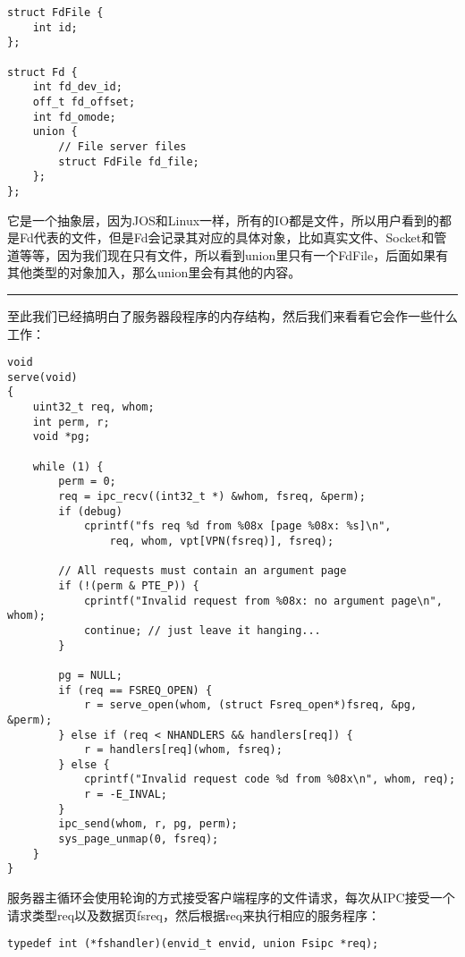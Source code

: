 \documentclass{article}
\begin{document}
\begin{CJK*}{UTF8}{gkai}
\begin{lstlisting}[style=ccode, firstnumber=26, title={\scriptsize \ttfamily \bfseries inc/fd.h}]
struct FdFile {
	int id;
};
 
struct Fd {
	int fd_dev_id;
	off_t fd_offset;
	int fd_omode;
	union {
		// File server files
		struct FdFile fd_file;
	};
};
\end{lstlisting}

它是一个抽象层，因为JOS和Linux一样，所有的IO都是文件，所以用户看到的都是Fd代表的文件，但是Fd会记录其对应的具体对象，比如真实文件、Socket和管道等等，因为我们现在只有文件，所以看到union里只有一个FdFile，后面如果有其他类型的对象加入，那么union里会有其他的内容。

\vspace{2em}
\hrule
\vspace{2em}

至此我们已经搞明白了服务器段程序的内存结构，然后我们来看看它会作一些什么工作：


\begin{lstlisting}[style=ccode, title={\scriptsize \ttfamily \bfseries fs/serv.c: serve()}]
void
serve(void)
{
    uint32_t req, whom;
    int perm, r;
    void *pg;

    while (1) {
        perm = 0;
        req = ipc_recv((int32_t *) &whom, fsreq, &perm);
        if (debug)
            cprintf("fs req %d from %08x [page %08x: %s]\n",
                req, whom, vpt[VPN(fsreq)], fsreq);

        // All requests must contain an argument page
        if (!(perm & PTE_P)) {
            cprintf("Invalid request from %08x: no argument page\n", whom);
            continue; // just leave it hanging...
        }

        pg = NULL;
        if (req == FSREQ_OPEN) {
            r = serve_open(whom, (struct Fsreq_open*)fsreq, &pg, &perm);
        } else if (req < NHANDLERS && handlers[req]) {
            r = handlers[req](whom, fsreq);
        } else {
            cprintf("Invalid request code %d from %08x\n", whom, req);
            r = -E_INVAL;
        }
        ipc_send(whom, r, pg, perm);
        sys_page_unmap(0, fsreq);
    }
}
\end{lstlisting}

服务器主循环会使用轮询的方式接受客户端程序的文件请求，每次从IPC接受一个请求类型req以及数据页fsreq，然后根据req来执行相应的服务程序：

\begin{lstlisting}[style=ccode, title={\scriptsize \ttfamily \bfseries fs/serv.c}]
typedef int (*fshandler)(envid_t envid, union Fsipc *req);


\end{lstlisting}
\end{CJK*}
\end{document}
